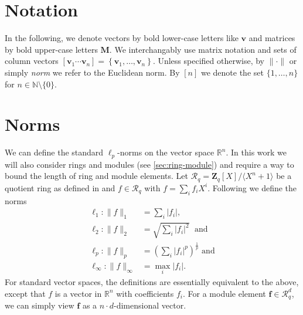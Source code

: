 


\section{Notation}
In the following, we denote vectors by bold lower-case letters like $\mathbf{v}$ and matrices by bold upper-case letters $\mathbf{M}$. We interchangably use matrix notation and sets of column vectors $\left[\mathbf{v}_1 \cdots \mathbf{v}_n\right] = \left\{\mathbf{v}_1, \dots, \mathbf{v}_n\right\}$. Unless specified otherwise, by $\| \cdot \|$ or simply \textit{norm} we refer to the Euclidean norm. By $[n]$ we denote the set $\{1, \dots, n\}$ for $n\in \mathbb{N} \setminus \{0\}$.

\section{Norms}\label{sec:norms}
We can define the standard $\ell_p$-norms on the vector space $\mathbb{R}^n$. In this work we will also consider rings and modules (see \cref{sec:ring-module}) and require a way to bound the length of ring and module elements. Let $\mathcal{R}_q=\mathbf{Z}_q[X]/\langle X^n + 1 \rangle$ be a quotient ring as defined in \cite{BDLOP18} and $f \in \mathcal{R}_q$ with $f = \sum_i f_i X^i$. Following \cite{BDLOP18} we define the norms
\begin{equation}
    \begin{aligned}
        \ell_1 : \| f \|_1           & = \sum_i |f_i|,                                         \\
        \ell_2 : \| f \|_2           & = \sqrt{\sum_i |f_i|^2} \;\text{ and}                   \\
        \ell_p : \| f \|_p           & = \left(\sum_i |f_i|^p\right)^{\frac{1}{p}} \text{ and} \\
        \ell_\infty : \| f \|_\infty & = \max_i |f_i|.
    \end{aligned}
\end{equation}
For standard vector spaces, the definitions are essentially equivalent to the above, except that $f$ is a vector in $\mathbb{R}^n$ with coefficients $f_i$. For a module element $\mathbf{f} \in \mathcal{R}_q^d$, we can simply view $\mathbf{f}$ as a $n\cdot d$-dimensional vector.

